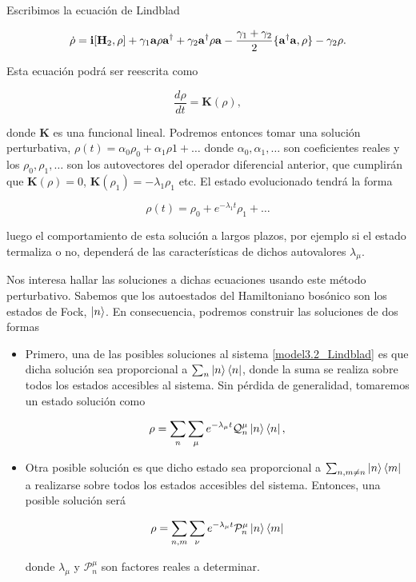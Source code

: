 \documentclass{report} %
\numberwithin{equation}{section}
\begin{document}
Escribimos la ecuación de Lindblad

\begin{equation}
   \dot{\rho} = {\bf i}[\mathbf{H}_2,\rho] + \gamma_1 {\bf a}\rho {\bf a}^{\dagger} + \gamma_2 {\bf a}^{\dagger} \rho{\bf a} - \frac{\gamma_1 + \gamma_2}{2} \{{\bf a}^{\dagger}{\bf a},\rho\} - \gamma_2 \rho.  
   \label{model3.2_Lindblad}
\end{equation}

Esta ecuación podrá ser reescrita como

$$
\frac{d\rho}{dt} = \mathbf{K}(\rho),
$$

donde $\mathbf{K}$ es una funcional lineal. Podremos entonces tomar una solución perturbativa, $\rho(t) = \alpha_0 \rho_0 + \alpha_1\rho1 + \ldots$ donde $\alpha_0, \alpha_1, \ldots$ son coeficientes reales y los $\rho_0, \rho_1, \ldots$ son los autovectores del operador diferencial anterior, que cumplirán que $\mathbf{K}(\rho) = 0$, $\mathbf{K}(\rho_1) = - \lambda_1 \rho_1$ etc. El estado evolucionado tendrá la forma 

$$
\rho (t) = \rho_0 + e^{-\lambda_1t} \rho_1 + \ldots 
$$

luego el comportamiento de esta solución a largos plazos, por ejemplo si el estado termaliza o no, dependerá de las características de dichos autovalores $\lambda_{\mu}$. 


Nos interesa hallar las soluciones a dichas ecuaciones usando este método perturbativo. Sabemos que los autoestados del Hamiltoniano bosónico son los estados de Fock, $\ket{n}$. En consecuencia, podremos construir las soluciones de dos formas

\begin{itemize}
    \item Primero, una de las posibles soluciones al sistema \eqref{model3.2_Lindblad} es que dicha solución sea proporcional a $\sum_{n} \ket{n}\bra{n}$, donde la suma se realiza sobre todos los estados accesibles al sistema. Sin pérdida de generalidad, tomaremos un estado solución como 
    
    \begin{equation}
        \rho=\sum_{n} \sum_{\mu} e^{-\lambda_{\mu}t} \mathcal{Q}_{n}^{\mu} \ket{n}\bra{n},
    \label{model3.2_diagonal}
    \end{equation}
    
    
    \item Otra posible solución es que dicho estado sea proporcional a $\sum_{n, m\neq n} \ket{n} \bra{m}$
    a realizarse sobre todos los estados accesibles del sistema. Entonces, una posible solución será
    
    \begin{equation}
        \rho= \sum_{n,m} \sum_{\nu} e^{-\lambda_{\mu} t} \mathcal{P}_{n}^{\mu} \ket{n}\bra{m} \label{model3.2_no_diagonal}
    \end{equation}
    
     donde $\lambda_{\mu}$ y $\mathcal{P}_{n}^{\mu}$ son factores reales a determinar.
\end{itemize}
\end{document}
